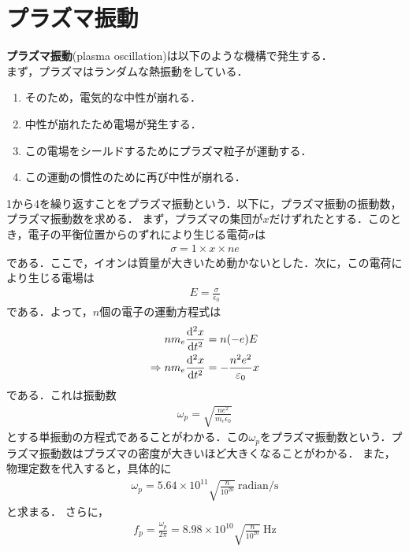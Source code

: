 \documentclass{report}
\begin{document}
\section{プラズマ振動}
\textbf{プラズマ振動}(plasma oscillation)は以下のような機構で発生する．\\
まず，プラズマはランダムな熱振動をしている．
\begin{enumerate}
  \item そのため，電気的な中性が崩れる．
  \item 中性が崩れたため電場が発生する．
  \item この電場をシールドするためにプラズマ粒子が運動する．
  \item この運動の慣性のために再び中性が崩れる．
\end{enumerate}
1から4を繰り返すことをプラズマ振動という．以下に，プラズマ振動の振動数，プラズマ振動数を求める．
まず，プラズマの集団が$x$だけずれたとする．このとき，電子の平衡位置からのずれにより生じる電荷$\sigma$は
\begin{align}
  \sigma = 1 \times x \times ne
\end{align}
である．ここで，イオンは質量が大きいため動かないとした．次に，この電荷により生じる電場は
\begin{align}
  E = \frac{\sigma}{\epsilon_0}
\end{align}
である．よって，$n$個の電子の運動方程式は
\begin{align}
  nm_e\dv[2]{x}{t} &= n(-e)E\\
  \Rightarrow nm_e \dv[2]{x}{t} &= -\frac{n^2e^2}{\varepsilon_0}x \label{plasma-oscillation}
\end{align}
である．これは振動数
\begin{align}
  \omega_p = \sqrt{\frac{ne^2}{m_e\epsilon_0}}
\end{align}
とする単振動の方程式であることがわかる．この$\omega_p$をプラズマ振動数という．プラズマ振動数はプラズマの密度が大きいほど大きくなることがわかる．
また，物理定数を代入すると，具体的に
\begin{align}
  \omega_p = 5.64 \times 10^{11} \sqrt{\frac{n}{10^{20}}} \ \text{radian/s}
\end{align}
と求まる．
さらに，
\begin{align}
  f_p = \frac{\omega_p}{2\pi} = 8.98 \times 10^{10} \sqrt{\frac{n}{10^{20}}} \ \text{Hz}
\end{align}
\end{document}
